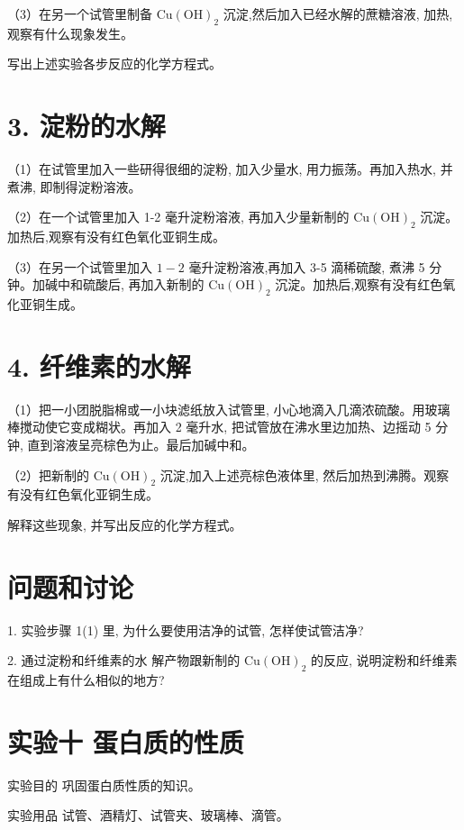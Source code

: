 \documentclass[10pt]{article}
\begin{document}
（3）在另一个试管里制备 \(\mathrm{{Cu}}{\left( \mathrm{{OH}}\right) }_{2}\) 沉淀,然后加入已经水解的蔗糖溶液, 加热, 观察有什么现象发生。

写出上述实验各步反应的化学方程式。

\section*{3. 淀粉的水解}

（1）在试管里加入一些研得很细的淀粉, 加入少量水, 用力振荡。再加入热水, 并煮沸, 即制得淀粉溶液。

（2）在一个试管里加入 1-2 毫升淀粉溶液, 再加入少量新制的 \(\mathrm{{Cu}}{\left( \mathrm{{OH}}\right) }_{2}\) 沉淀。加热后,观察有没有红色氧化亚铜生成。

（3）在另一个试管里加入 \(1 - 2\) 毫升淀粉溶液,再加入 3-5 滴稀硫酸, 煮沸 5 分钟。加碱中和硫酸后, 再加入新制的 \(\mathrm{{Cu}}{\left( \mathrm{{OH}}\right) }_{2}\) 沉淀。加热后,观察有没有红色氧化亚铜生成。

\section*{4. 纤维素的水解}

（1）把一小团脱脂棉或一小块滤纸放入试管里, 小心地滴入几滴浓硫酸。用玻璃棒搅动使它变成糊状。再加入 2 毫升水, 把试管放在沸水里边加热、边摇动 5 分钟, 直到溶液呈亮棕色为止。最后加碱中和。

（2）把新制的 \(\mathrm{{Cu}}{\left( \mathrm{{OH}}\right) }_{2}\) 沉淀,加入上述亮棕色液体里, 然后加热到沸腾。观察有没有红色氧化亚铜生成。

解释这些现象, 并写出反应的化学方程式。

\section*{问题和讨论}

1. 实验步骤 1(1) 里, 为什么要使用洁净的试管, 怎样使试管洁净?

2. 通过淀粉和纤维素的水 解产物跟新制的 \(\mathrm{{Cu}}{\left( \mathrm{{OH}}\right) }_{2}\) 的反应, 说明淀粉和纤维素在组成上有什么相似的地方?

\section*{实验十 蛋白质的性质}

实验目的 巩固蛋白质性质的知识。

实验用品 试管、酒精灯、试管夹、玻璃棒、滴管。
\end{document}
